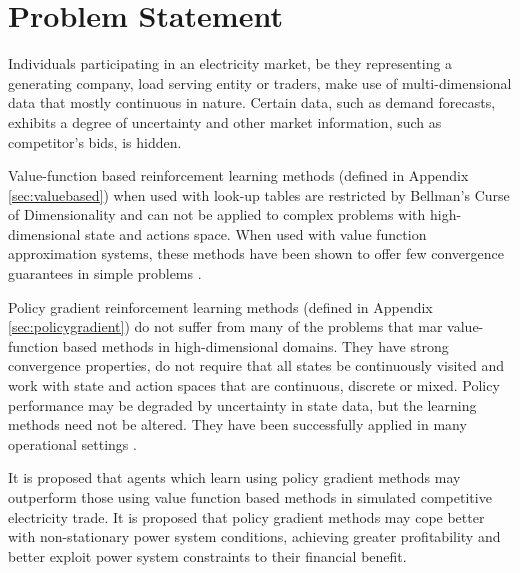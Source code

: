 \section{Problem Statement}%
Individuals participating in an electricity market, be they representing a
generating company, load serving entity or traders, make use of
multi-dimensional data that mostly continuous in nature.  Certain data, such as
demand forecasts, exhibits a degree of uncertainty and other market
information, such as competitor's bids, is hidden.

Value-function based reinforcement learning methods (defined in Appendix
\ref{sec:valuebased}) when used with look-up tables are restricted by
Bellman's Curse of Dimensionality \cite{bellman:1961} and can not be applied
to complex problems with high-dimensional state and actions space.  When used
with value function approximation systems, these methods have been shown to
offer few convergence guarantees in simple problems
\cite{gordon:95,baird:95,tsitsiklis:94}.

Policy gradient reinforcement learning methods (defined in Appendix
\ref{sec:policygradient}) do not suffer from many of the problems that
mar value-function based methods in high-dimensional domains.  They have
strong convergence properties, do not require that all states be continuously
visited and work with state and action spaces that are continuous, discrete
or mixed.  Policy performance may be degraded by uncertainty in state data,
but the learning methods need not be altered.  They have been successfully
applied in many operational settings
\cite{barto:policy,shaal:robots,moody:direct,peshkin:routing}.

It is proposed that agents which learn using policy gradient methods may
outperform those using value function based methods in simulated
competitive electricity trade.  It is proposed that policy gradient methods may
cope better with non-stationary power system conditions, achieving greater
profitability and better exploit power system constraints to their financial
benefit.


